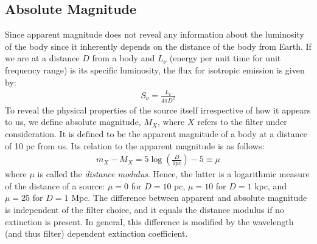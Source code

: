 \documentclass[a4paper,11pt]{report}
\newcommand{\ti}[1]{\textit{#1}}
\begin{document}
\subsection{Absolute Magnitude}
Since apparent magnitude does not reveal any information about the luminosity of the body since it inherently depends on the distance of the body from Earth. If we are at a distance $D$ from a body and $L_\nu$ (energy per unit time for unit frequency range) is its specific luminosity, the flux for isotropic emission is given by:
\begin{align}
  S_\nu = \frac{L_\nu}{4 \pi D^2} \label{eq:flux and luminosity}
\end{align}
To reveal the physical properties of the source itself irrespective of how it appears to us, we define absolute magnitude, $M_X$, where $X$ refers to the filter under consideration. It is defined to be the apparent magnitude of a body at a distance of 10 pc from us. Its relation to the apparent magnitude is as follows:
\begin{align*}
  m_X - M_X = 5 \log \left( \frac{D}{1 pc} \right) - 5 \equiv \mu
\end{align*}
where $\mu$ is called the \ti{distance modulus}. Hence, the latter is a logarithmic measure of the distance of a source: $\mu = 0$ for $D = 10$ pc, $\mu = 10$ for $D = 1$ kpc, and $\mu = 25$ for $D = 1$ Mpc. The difference between apparent and absolute magnitude is independent of the filter choice, and it equals the distance modulus if no extinction is present. In general, this difference is modified by the wavelength (and thus filter) dependent extinction coefficient.
\end{document}
